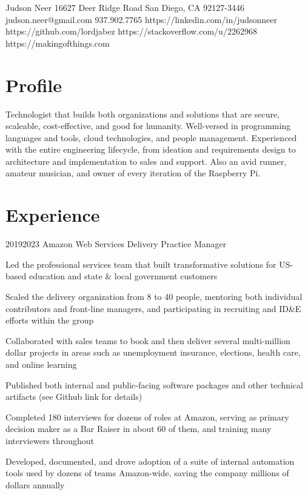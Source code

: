 \documentclass{article}
\begin{document}
\header
  {Judson Neer}
  {16627 Deer Ridge Road}
  {San Diego, CA 92127-3446}
  {judson.neer@gmail.com}
  {937.902.7765}
  {https://linkedin.com/in/judsonneer}
  {https://github.com/lordjabez}
  {https://stackoverflow.com/u/2262968}
  {https://makingofthings.com}


\section{Profile}

Technologist that builds both organizations and solutions that are secure, scaleable, cost-effective, and good for humanity. Well-versed in programming languages and tools, cloud technologies, and people management. Experienced with the entire engineering lifecycle, from ideation and requirements design to architecture and implementation to sales and support. Also an avid runner, amateur musician, and owner of every iteration of the Raspberry Pi.


\section{Experience}

\job
  {2019}{2023}
  {Amazon Web Services}
  {Delivery Practice Manager}
  {\begin{achievements}
    \item Led the professional services team that built transformative solutions for US-based education and state \& local government customers
    \item Scaled the delivery organization from 8 to 40 people, mentoring both individual contributors and front-line managers, and participating in recruiting and ID\&E efforts within the group
    \item Collaborated with sales teams to book and then deliver several multi-million dollar projects in areas such as unemployment insurance, elections, health care, and online learning
    \item Published both internal and public-facing software packages and other technical artifacts (see Github link for details)
    \item Completed 180 interviews for dozens of roles at Amazon, serving as primary decision maker as a Bar Raiser in about 60 of them, and training many interviewers throughout
    \item Developed, documented, and drove adoption of a suite of internal automation tools used by dozens of teams Amazon-wide, saving the company millions of dollars annually
  \end{achievements}}
\end{document}
